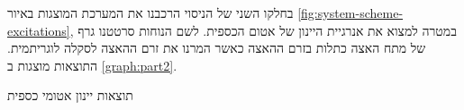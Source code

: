 \documentclass{article}
\begin{document}

בחלקו השני של הניסוי הרכבנו את המערכת המוצגות באיור
\ref{fig:system-scheme-excitations}, 
במטרה למצוא את אנרגיית היינון של אטום הכספית.
לשם הנוחות סרטטנו גרף של מתח האצה כתלות בזרם ההאצה כאשר המרנו את זרם ההאצה לסקלה לוגריתמית.
התוצאות מוצגות ב
\ref{graph:part2}.

\begin{graph}[H]
	\begin{center}
	\resizebox{\textwidth}{!}{}
	\end{center}
	\caption{תוצאות יינון אטומי כספית}
	\label{graph:part2}
\end{graph}




\end{document}
